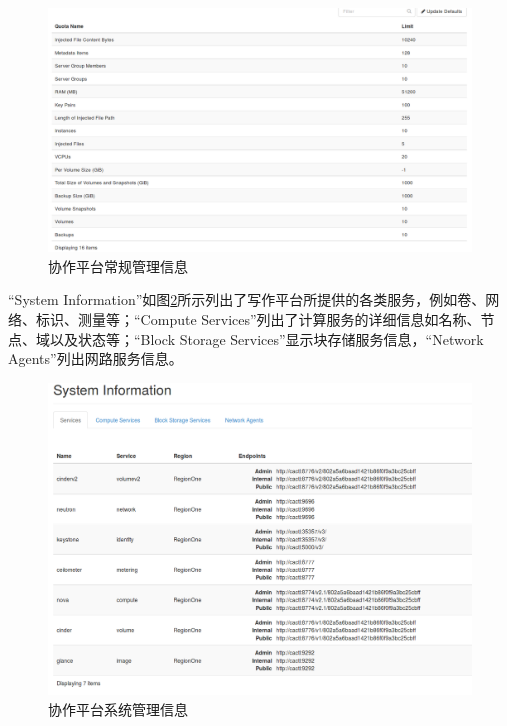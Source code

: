 \documentclass[12pt]{ctexart}%
\begin{document}
\begin{figure}[!htb]
\centering
\includegraphics[width=6in]{./figures/Admin_System_Defaults}
\caption{协作平台常规管理信息}
\label{fig:adminsystemdefaults}
\end{figure}

``System Information''如图\ref{fig:adminsystemsysteminformation}所示列出了写作平台所提供的各类服务，例如卷、网络、标识、测量等；``Compute Services''列出了计算服务的详细信息如名称、节点、域以及状态等；``Block Storage Services''显示块存储服务信息，``Network Agents''列出网路服务信息。
\begin{figure}[!htb]
\centering
\includegraphics[width=6in]{./figures/Admin_System_SystemInformation}
\caption{协作平台系统管理信息}
\label{fig:adminsystemsysteminformation}
\end{figure}
\end{document}
